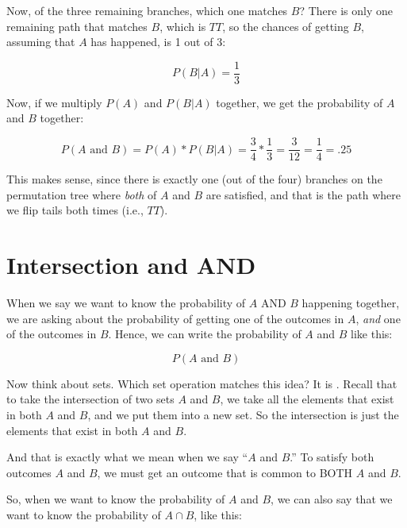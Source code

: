 \documentclass[../../../main.tex]{subfiles}
\begin{document}
\noindent
Now, of the three remaining branches, which one matches $B$? There is only one remaining path that matches $B$, which is $TT$, so the chances of getting $B$, assuming that $A$ has happened, is 1 out of 3:

\begin{equation*}
  P(B | A) = \frac{1}{3}
\end{equation*}

\noindent
Now, if we multiply $P(A)$ and $P(B | A)$ together, we get the probability of $A$ and $B$ together:

\begin{equation*}
  P(A \text{ and } B) = P(A) * P(B | A) = \frac{3}{4} * \frac{1}{3} = \frac{3}{12} = \frac{1}{4} = .25
\end{equation*}

\noindent
This makes sense, since there is exactly one (out of the four) branches on the permutation tree where \emph{both} of $A$ and $B$ are satisfied, and that is the path where we flip tails both times (i.e., $TT$).


\section{Intersection and AND}

When we say we want to know the probability of $A$ AND $B$ happening together, we are asking about the probability of getting one of the outcomes in $A$, \emph{and} one of the outcomes in $B$. Hence, we can write the probability of $A$ and $B$ like this:

\begin{equation*}
  P(A \text{ and } B)
\end{equation*}

\noindent
Now think about sets. Which set operation matches this idea? It is . Recall that to take the intersection of two sets $A$ and $B$, we take all the elements that exist in both $A$ and $B$, and we put them into a new set. So the intersection is just the elements that exist in both $A$ and $B$. 

And that is exactly what we mean when we say ``$A$ and $B$.'' To satisfy both outcomes $A$ and $B$, we must get an outcome that is common to BOTH $A$ and $B$. 

So, when we want to know the probability of $A$ and $B$, we can also say that we want to know the probability of $A \cap B$, like this:
\end{document}
